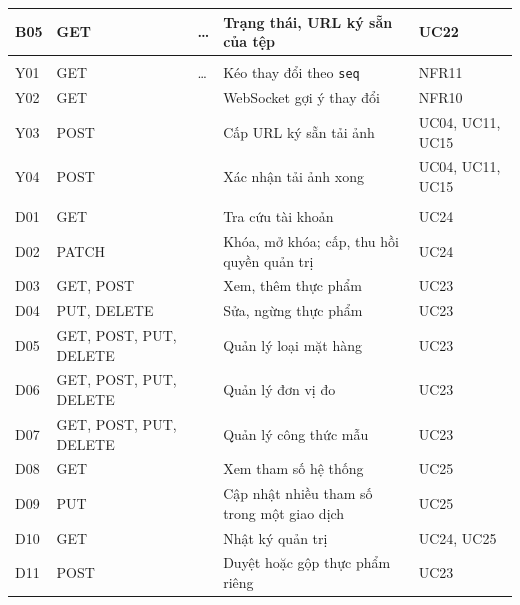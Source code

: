 {\begin{longtable}{|C{0.8cm}|C{1.8cm}|L{5.4cm}|L{\dimexpr{}\arrayrulewidth-0.8cm-1.8cm-5.4cm-1.85cm\relax}|C{1.85cm}|}
B05 & GET & \ldots{} & Trạng thái, URL ký sẵn của tệp & UC22\\ \hline
{}\\ \hline
Y01 & GET & \ldots{} & Kéo thay đổi theo \texttt{seq} & NFR11\\ \hline
Y02 & GET &  & WebSocket gợi ý thay đổi & NFR10\\ \hline
Y03 & POST &  & Cấp URL ký sẵn tải ảnh & UC04, UC11, UC15\\ \hline
Y04 & POST &  & Xác nhận tải ảnh xong & UC04, UC11, UC15\\ \hline
{}\\ \hline
D01 & GET &  & Tra cứu tài khoản & UC24\\ \hline
D02 & PATCH &  & Khóa, mở khóa; cấp, thu hồi quyền quản trị & UC24\\ \hline
D03 & GET, POST &  & Xem, thêm thực phẩm & UC23\\ \hline
D04 & PUT, DELETE &  & Sửa, ngừng thực phẩm & UC23\\ \hline
D05 & GET, POST, PUT, DELETE &  & Quản lý loại mặt hàng & UC23\\ \hline
D06 & GET, POST, PUT, DELETE &  & Quản lý đơn vị đo & UC23\\ \hline
D07 & GET, POST, PUT, DELETE &  & Quản lý công thức mẫu & UC23\\ \hline
D08 & GET &  & Xem tham số hệ thống & UC25\\ \hline
D09 & PUT &  & Cập nhật nhiều tham số trong một giao dịch & UC25\\ \hline
D10 & GET &  & Nhật ký quản trị & UC24, UC25\\ \hline
D11 & POST &  & Duyệt hoặc gộp thực phẩm riêng & UC23\\ \hline
\end{longtable}
}

